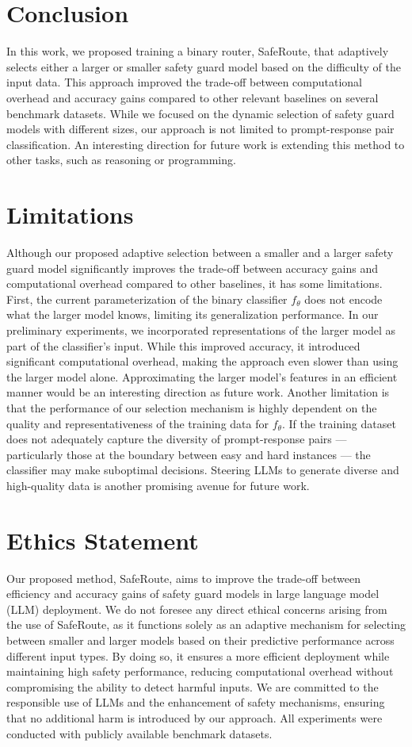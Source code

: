 \section{Conclusion}
In this work, we proposed training a binary router, SafeRoute, that adaptively selects either a larger or smaller safety guard model based on the difficulty of the input data. This approach improved the trade-off between computational overhead and accuracy gains compared to other relevant baselines on several benchmark datasets. While we focused on the dynamic selection of safety guard models with different sizes, our approach is not limited to prompt-response pair classification. An interesting direction for future work is extending this method to other tasks, such as reasoning or programming.

\section*{Limitations}
Although our proposed adaptive selection between a smaller and a larger safety guard model significantly improves the trade-off between accuracy gains and computational overhead compared to other baselines, it has some limitations. First, the current parameterization of the binary classifier $f_\theta$ does not encode what the larger model knows, limiting its generalization performance. In our preliminary experiments, we incorporated representations of the larger model as part of the classifier’s input. While this improved accuracy, it introduced significant computational overhead, making the approach even slower than using the larger model alone. Approximating the larger model's features in an efficient manner would be an interesting direction as future work. Another limitation is that the performance of our selection mechanism is highly dependent on the quality and representativeness of the training data for $f_\theta$. If the training dataset does not adequately capture the diversity of prompt-response pairs --- particularly those at the boundary between easy and hard instances --- the classifier may make suboptimal decisions. Steering LLMs to generate diverse and high-quality data is another promising avenue for future work.


\section*{Ethics Statement}
Our proposed method, SafeRoute, aims to improve the trade-off between efficiency and accuracy gains of safety guard models in large language model (LLM) deployment. We do not foresee any direct ethical concerns arising from the use of SafeRoute, as it functions solely as an adaptive mechanism for selecting between smaller and larger models based on their predictive performance across different input types. By doing so, it ensures a more efficient deployment while maintaining high safety performance, reducing computational overhead without compromising the ability to detect harmful inputs. We are committed to the responsible use of LLMs and the enhancement of safety mechanisms, ensuring that no additional harm is introduced by our approach. All experiments were conducted with publicly available benchmark datasets. 